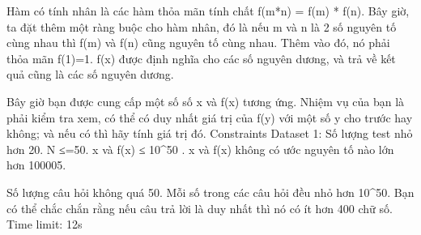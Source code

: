 Hàm có tính nhân là các hàm thỏa mãn tính chất f(m*n) = f(m) * f(n). Bây giờ, ta đặt thêm một ràng buộc cho hàm nhân, đó là nếu m và n là 2 số nguyên tố cùng nhau thì f(m) và f(n) cũng nguyên tố cùng nhau. Thêm vào đó, nó phải thỏa mãn f(1)=1. f(x) được định nghĩa cho các số nguyên dương, và trả về kết quả cũng là các số nguyên dương.  

   Bây giờ bạn được cung cấp một số số x và f(x) tương ứng. Nhiệm vụ của bạn là phải kiểm tra xem, có thể có duy nhất giá trị của f(y) với một số y cho trước hay không; và nếu có thì hãy tính giá trị đó.
   Constraints  
Dataset 1: Số lượng test nhỏ hơn 20. N ≤=50. x và f(x) ≤ 10^50 . x và f(x) không có ước nguyên tố nào lớn hơn 100005.  

   Số lượng câu hỏi không quá 50. Mỗi số trong các câu hỏi đều nhỏ hơn 10^50. Bạn có thể chắc chắn rằng nếu câu trả lời là duy nhất thì nó có ít hơn 400 chữ số. Time limit: 12s